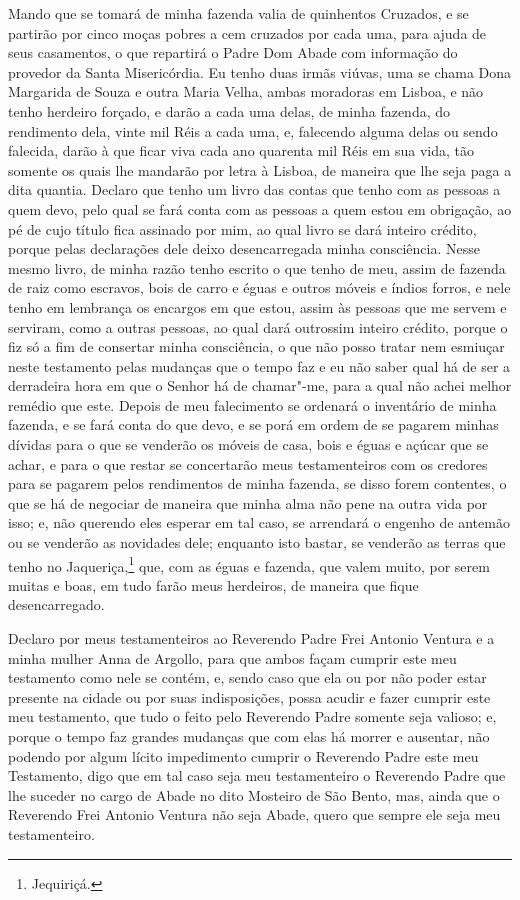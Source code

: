 \begin{linenumbers}
Mando que se tomará de minha fazenda valia de quinhentos Cruzados, e se
partirão por cinco moças pobres a cem cruzados por cada uma, para ajuda
de seus casamentos, o que repartirá o Padre Dom Abade com informação do
provedor da Santa Misericórdia. Eu tenho duas irmãs viúvas, uma se
chama Dona Margarida de Souza e outra Maria Velha, ambas moradoras em 
Lisboa, e não tenho herdeiro forçado, e darão a cada uma delas, de
minha fazenda, do rendimento dela, vinte mil Réis a cada uma, e,
falecendo alguma delas ou sendo falecida, darão à que ficar viva cada
ano quarenta mil Réis em sua vida, tão somente os quais lhe mandarão
por letra à Lisboa, de maneira que lhe seja paga a dita quantia.
Declaro que tenho um livro das contas que tenho com as pessoas a quem
devo, pelo qual se fará conta com as pessoas a quem estou em obrigação,
ao pé de cujo título fica assinado por mim, ao qual livro se dará
inteiro crédito, porque pelas declarações dele deixo desencarregada
minha consciência. Nesse mesmo livro, de minha razão tenho escrito o
que tenho de meu, assim de fazenda de raiz como escravos, bois de carro
e éguas e outros móveis e índios forros, e nele tenho em lembrança os
encargos em que estou, assim às pessoas que me servem e serviram, como
a outras pessoas, ao qual dará outrossim inteiro crédito, porque o fiz
só a fim de consertar minha consciência, o que não posso tratar nem
esmiuçar neste testamento pelas mudanças que o tempo faz e eu não saber
qual há de ser a derradeira hora em que o Senhor há de chamar"-me, para
a qual não achei melhor remédio que este. Depois de meu falecimento se
ordenará o inventário de minha fazenda, e se fará conta do que devo, e
se porá em ordem de se pagarem minhas dívidas para o que se venderão os
móveis de casa, bois e éguas e açúcar que se achar, e para o que restar
se concertarão meus testamenteiros com os credores para se pagarem
pelos rendimentos de minha fazenda, se disso forem contentes, o que se
há de negociar de maneira que minha alma não pene na outra vida por
isso; e, não querendo eles esperar em tal caso, se arrendará o engenho
de antemão ou se venderão as novidades dele; enquanto isto bastar, se
venderão as terras que tenho no Jaqueriça,\footnote{ Jequiriçá.} que,
com as éguas e fazenda, que valem muito, por serem muitas e boas, em
tudo farão meus herdeiros, de maneira que fique desencarregado.

Declaro por meus testamenteiros ao Reverendo Padre Frei Antonio Ventura
e a minha mulher Anna de Argollo, para que ambos façam cumprir este meu
testamento como nele se contém, e, sendo caso que ela ou por não poder
estar presente na cidade ou por suas indisposições, possa acudir e
fazer cumprir este meu testamento, que tudo o feito pelo Reverendo
Padre somente seja valioso; e, porque o tempo faz grandes mudanças que
com elas há morrer e ausentar, não podendo por algum lícito impedimento
cumprir o Reverendo Padre este meu Testamento, digo que em tal caso
seja meu testamenteiro o Reverendo Padre que lhe suceder no cargo de
Abade no dito Mosteiro de São Bento, mas, ainda que o Reverendo Frei
Antonio Ventura não seja Abade, quero que sempre ele seja meu
testamenteiro.


\end{linenumbers}
